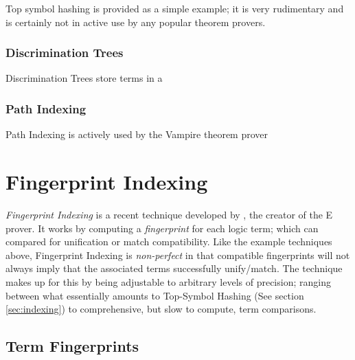 Top symbol hashing is provided as a simple example; it is very rudimentary and
is certainly not in active use by any popular theorem provers.

\subsubsection{Discrimination Trees}

Discrimination Trees store terms in a 

\subsubsection{Path Indexing}

Path Indexing is actively used by the Vampire theorem prover 
\cite{vampire}

\section{Fingerprint Indexing}
\label{sec:fingerprint}

\emph{Fingerprint Indexing} is a recent technique developed by , the creator
of the E prover. It works by computing a \emph{fingerprint} for each logic term;
which can compared for unification or match compatibility. 
Like the example techniques above,
Fingerprint Indexing is \emph{non-perfect} in that compatible fingerprints will not
always imply that the associated terms successfully unify/match. The technique
makes up for this by being adjustable to arbitrary levels of precision; ranging between
what essentially amounts to Top-Symbol Hashing (See section \ref{sec:indexing})
to comprehensive, but slow to compute, term comparisons.

\subsection{Term Fingerprints}
\label{sec:fingerprints}

